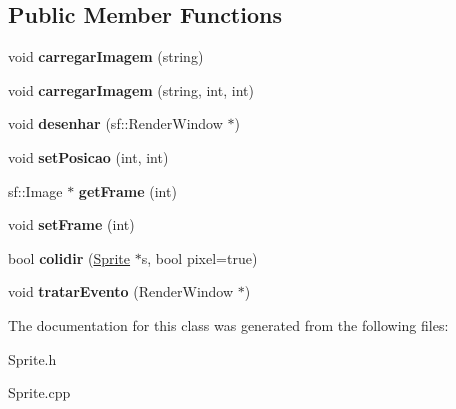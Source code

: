 \subsection*{Public Member Functions}
\begin{DoxyCompactItemize}
\item 
\hypertarget{class_edda_1_1_sprite_af0f5a95c9e240ef31c3f7bd31e4a7b80}{
void {\bfseries carregarImagem} (string)}
\label{class_edda_1_1_sprite_af0f5a95c9e240ef31c3f7bd31e4a7b80}

\item 
\hypertarget{class_edda_1_1_sprite_a0c0c1248fd001977f2246d9d560a92a1}{
void {\bfseries carregarImagem} (string, int, int)}
\label{class_edda_1_1_sprite_a0c0c1248fd001977f2246d9d560a92a1}

\item 
\hypertarget{class_edda_1_1_sprite_a08c180e752e186a0130ac5413dca1909}{
void {\bfseries desenhar} (sf::RenderWindow $\ast$)}
\label{class_edda_1_1_sprite_a08c180e752e186a0130ac5413dca1909}

\item 
\hypertarget{class_edda_1_1_sprite_a67300b51eeeeacf197bceeafae0cc308}{
void {\bfseries setPosicao} (int, int)}
\label{class_edda_1_1_sprite_a67300b51eeeeacf197bceeafae0cc308}

\item 
\hypertarget{class_edda_1_1_sprite_a05dd1b485aca4b45e8685988a886d273}{
sf::Image $\ast$ {\bfseries getFrame} (int)}
\label{class_edda_1_1_sprite_a05dd1b485aca4b45e8685988a886d273}

\item 
\hypertarget{class_edda_1_1_sprite_a569770c988611814e3f712e80327f085}{
void {\bfseries setFrame} (int)}
\label{class_edda_1_1_sprite_a569770c988611814e3f712e80327f085}

\item 
\hypertarget{class_edda_1_1_sprite_aff9acd347a11e232857138d161547479}{
bool {\bfseries colidir} (\hyperlink{class_edda_1_1_sprite}{Sprite} $\ast$s, bool pixel=true)}
\label{class_edda_1_1_sprite_aff9acd347a11e232857138d161547479}

\item 
\hypertarget{class_edda_1_1_sprite_acebf844c4240554758e20327076a1ca9}{
void {\bfseries tratarEvento} (RenderWindow $\ast$)}
\label{class_edda_1_1_sprite_acebf844c4240554758e20327076a1ca9}

\end{DoxyCompactItemize}


The documentation for this class was generated from the following files:\begin{DoxyCompactItemize}
\item 
Sprite.h\item 
Sprite.cpp\end{DoxyCompactItemize}
